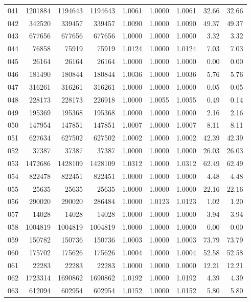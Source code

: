 \begin{longtable}{crrrrrrrr}
041 & 1201884 & 1194643 & 1194643 & 1.0061 & 1.0000 & 1.0061 & 32.66 & 32.66 \\
042 & 342520 & 339457 & 339457 & 1.0090 & 1.0000 & 1.0090 & 49.37 & 49.37 \\
043 & 677656 & 677656 & 677656 & 1.0000 & 1.0000 & 1.0000 & 3.32 & 3.32 \\
044 & 76858 & 75919 & 75919 & 1.0124 & 1.0000 & 1.0124 & 7.03 & 7.03 \\
045 & 26164 & 26164 & 26164 & 1.0000 & 1.0000 & 1.0000 & 0.00 & 0.00 \\
046 & 181490 & 180844 & 180844 & 1.0036 & 1.0000 & 1.0036 & 5.76 & 5.76 \\
047 & 316261 & 316261 & 316261 & 1.0000 & 1.0000 & 1.0000 & 0.05 & 0.05 \\
048 & 228173 & 228173 & 226918 & 1.0000 & 1.0055 & 1.0055 & 0.49 & 0.14 \\
049 & 195369 & 195368 & 195368 & 1.0000 & 1.0000 & 1.0000 & 2.16 & 2.16 \\
050 & 147954 & 147851 & 147851 & 1.0007 & 1.0000 & 1.0007 & 8.11 & 8.11 \\
051 & 627634 & 627502 & 627502 & 1.0002 & 1.0000 & 1.0002 & 42.39 & 42.39 \\
052 & 37387 & 37387 & 37387 & 1.0000 & 1.0000 & 1.0000 & 26.03 & 26.03 \\
053 & 1472686 & 1428109 & 1428109 & 1.0312 & 1.0000 & 1.0312 & 62.49 & 62.49 \\
054 & 822478 & 822451 & 822451 & 1.0000 & 1.0000 & 1.0000 & 4.48 & 4.48 \\
055 & 25635 & 25635 & 25635 & 1.0000 & 1.0000 & 1.0000 & 22.16 & 22.16 \\
056 & 290020 & 290020 & 286484 & 1.0000 & 1.0123 & 1.0123 & 1.02 & 1.20 \\
057 & 14028 & 14028 & 14028 & 1.0000 & 1.0000 & 1.0000 & 3.94 & 3.94 \\
058 & 1004819 & 1004819 & 1004819 & 1.0000 & 1.0000 & 1.0000 & 0.00 & 0.00 \\
059 & 150782 & 150736 & 150736 & 1.0003 & 1.0000 & 1.0003 & 73.79 & 73.79 \\
060 & 175702 & 175626 & 175626 & 1.0004 & 1.0000 & 1.0004 & 52.58 & 52.58 \\
061 & 22283 & 22283 & 22283 & 1.0000 & 1.0000 & 1.0000 & 12.21 & 12.21 \\
062 & 1723314 & 1690862 & 1690862 & 1.0192 & 1.0000 & 1.0192 & 4.39 & 4.39 \\
063 & 612094 & 602954 & 602954 & 1.0152 & 1.0000 & 1.0152 & 5.80 & 5.80 \\

\end{longtable}
